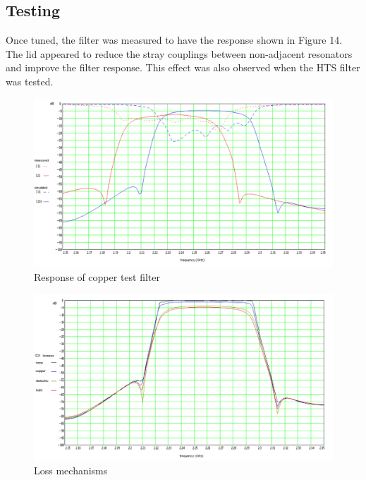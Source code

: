 \subsection{Testing}
Once tuned, the filter was measured to have the response shown in Figure 14. The lid appeared to reduce the stray couplings between non-adjacent resonators and improve the filter response. This effect was also observed when the HTS filter was tested.

\begin{figure}[ht]
\begin{center}
\includegraphics[scale=0.4]{fig/test-copper-response.pdf}
\end{center}
\vspace{-1em}
\caption{Response of copper test filter}
\label{figure:test-copper-response}
\end{figure}

\begin{figure}[ht]
\begin{center}
\includegraphics[scale=0.4]{fig/test-copper-loss.pdf}
\end{center}
\vspace{-1em}
\caption{Loss mechanisms}
\label{figure:test-copper-loss}
\end{figure}

